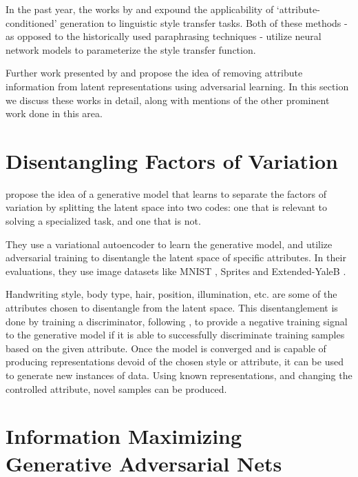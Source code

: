 In the past year, the works by \cite{hu2017toward} and \cite{ficler2017controlling} expound the applicability of `attribute-conditioned' generation to linguistic style transfer tasks. Both of these methods - as opposed to the historically used paraphrasing techniques \citep{xu2012paraphrasing} - utilize neural network models \citep{lecun2015deep} to parameterize the style transfer function.

Further work presented by \cite{shen2017style} and \cite{fu2017style} propose the idea of removing attribute information from latent representations using adversarial learning. In this section we discuss these works in detail, along with mentions of the other prominent work done in this area.


\section{Disentangling Factors of Variation}

\cite{mathieu2016disentangling} propose the idea of a generative model that learns to separate the factors of variation by splitting the latent space into two codes: one that is relevant to solving a specialized task, and one that is not.

They use a variational autoencoder to learn the generative model, and utilize adversarial training to disentangle the latent space of specific attributes. In their evaluations, they use image datasets like MNIST \citep{lecun2004learning,lecun2010mnist}, Sprites \citep{reed2015deep} and Extended-YaleB \citep{georghiades2001few}.

Handwriting style, body type, hair, position, illumination, etc. are some of the attributes chosen to disentangle from the latent space. This disentanglement is done by training a discriminator, following \cite{goodfellow2014generative}, to provide a negative training signal to the generative model if it is able to successfully discriminate training samples based on the given attribute. Once the model is converged and is capable of producing representations devoid of the chosen style or attribute, it can be used to generate new instances of data. Using known representations, and changing the controlled attribute, novel samples can be produced.


\section{Information Maximizing Generative Adversarial Nets}

